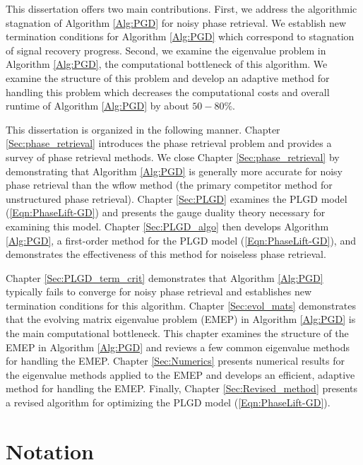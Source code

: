 This dissertation offers two main contributions.  First, we address the algorithmic stagnation of Algorithm \ref{Alg:PGD} for noisy phase retrieval.   We establish new termination conditions for Algorithm \ref{Alg:PGD} which correspond to stagnation of signal recovery progress.  Second, we examine the eigenvalue problem in Algorithm \ref{Alg:PGD}, the computational bottleneck of this algorithm.  We examine the structure of this problem and develop an adaptive method for handling this problem which decreases the computational costs and overall runtime of Algorithm \ref{Alg:PGD} by about $50-80\%$.


This dissertation is organized in the following manner.  Chapter \ref{Sec:phase_retrieval} introduces the phase retrieval problem and provides a survey of phase retrieval methods.  
We close Chapter \ref{Sec:phase_retrieval} by demonstrating that Algorithm \ref{Alg:PGD} is generally more accurate for noisy phase retrieval than the wflow method (the primary competitor method for unstructured phase retrieval).
Chapter \ref{Sec:PLGD} examines the PLGD model (\ref{Eqn:PhaseLift-GD}) and presents the gauge duality theory necessary for examining this model.  Chapter \ref{Sec:PLGD_algo} then develops Algorithm \ref{Alg:PGD}, a first-order method for the PLGD model (\ref{Eqn:PhaseLift-GD}), and demonstrates the effectiveness of this method for noiseless phase retrieval.

Chapter \ref{Sec:PLGD_term_crit} demonstrates that Algorithm \ref{Alg:PGD} typically fails to converge for noisy phase retrieval and establishes new termination conditions for this algorithm.  Chapter \ref{Sec:evol_mats}  demonstrates that the evolving matrix eigenvalue problem (EMEP) in Algorithm \ref{Alg:PGD} is the main computational bottleneck.  This chapter examines the structure of the EMEP in Algorithm \ref{Alg:PGD} and reviews a few common eigenvalue methods for handling the EMEP.  Chapter \ref{Sec:Numerics} presents numerical results for the eigenvalue methods applied to the EMEP and develops an efficient, adaptive method for handling the EMEP.  Finally, Chapter \ref{Sec:Revised_method} presents a revised algorithm for optimizing the PLGD model (\ref{Eqn:PhaseLift-GD}).



\section{Notation} 		\label{Subsec:intro-notation}


